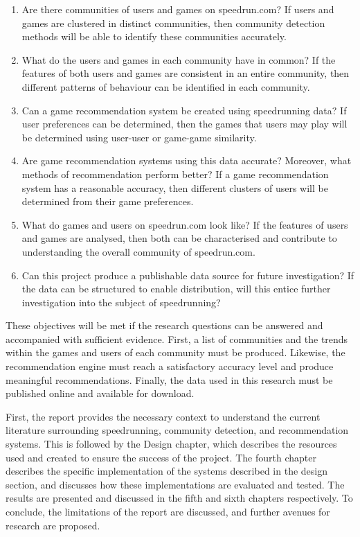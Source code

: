 \begin{enumerate}
    \item Are there communities of users and games on speedrun.com? If users and games are clustered in distinct communities, then community detection methods will be able to identify these communities accurately. 
    \item What do the users and games in each community have in common? If the features of both users and games are consistent in an entire community, then different patterns of behaviour can be identified in each community.
    \item Can a game recommendation system be created using speedrunning data? If user preferences can be determined, then the games that users may play will be determined using user-user or game-game similarity.
    \item Are game recommendation systems using this data accurate? Moreover, what methods of recommendation perform better? If a game recommendation system has a reasonable accuracy, then different clusters of users will be determined from their game preferences.
    \item What do games and users on speedrun.com look like? If the features of users and games are analysed, then both can be characterised and contribute to understanding the overall community of speedrun.com.
    \item Can this project produce a publishable data source for future investigation? If the data can be structured to enable distribution, will this entice further investigation into the subject of speedrunning?
\end{enumerate}

These objectives will be met if the research questions can be answered and accompanied with sufficient evidence. First, a list of communities and the trends within the games and users of each community must be produced. Likewise, the recommendation engine must reach a satisfactory accuracy level and produce meaningful recommendations. Finally, the data used in this research must be published online and available for download.


First, the report provides the necessary context to understand the current literature surrounding speedrunning, community detection, and recommendation systems. This is followed by the Design chapter, which describes the resources used and created to ensure the success of the project. The fourth chapter describes the specific implementation of the systems described in the design section, and discusses how these implementations are evaluated and tested. The results are presented and discussed in the fifth and sixth chapters respectively. To conclude, the limitations of the report are discussed, and further avenues for research are proposed.